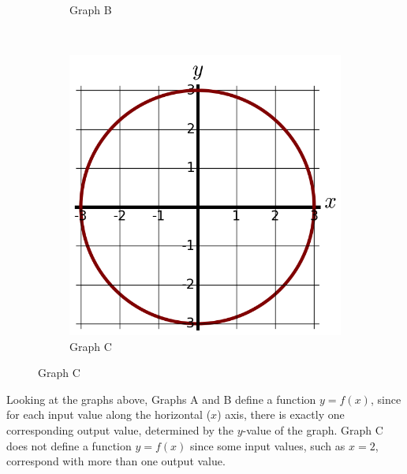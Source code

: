 \begin{example}
\begin{figure}[!ht]
\begin{subfigure}[b]{0.3\textwidth}
        \caption{Graph B}
    \end{subfigure}
    ~
    \begin{subfigure}[b]{0.3\textwidth}
        \includegraphics[width=\textwidth]{img/chap1/sec1-2/ex114c.png}
        \caption{Graph C}
    \end{subfigure}
\end{figure}

\begin{solution} Looking at the graphs above, Graphs A and B define a function $y=f(x)$, since for each input value along the horizontal ($x$) axis, there is exactly one corresponding output value, determined by the $y$-value of the graph. Graph C does not define a function $y=f(x)$ since some input values, such as
$x=2$, correspond with more than one output value.
\end{solution}\end{example}

